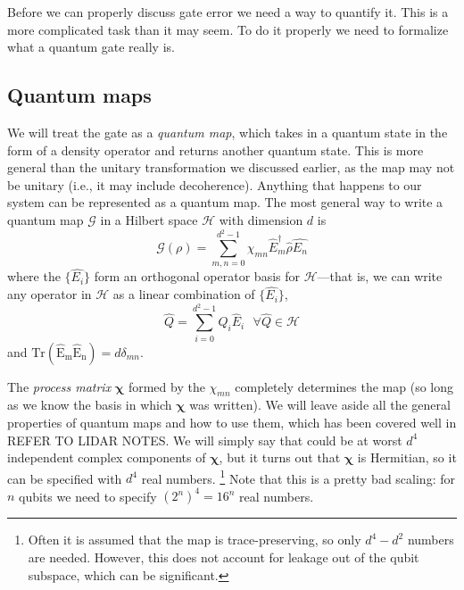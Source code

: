Before we can properly discuss gate error we need a way to quantify it. This is a more complicated task than it may seem. To do it properly we need to formalize what a quantum gate really is.

\subsection{Quantum maps}
We will treat the gate as a \textit{quantum map}, which takes in a quantum state in the form of a density operator and returns another quantum state. This is more general than the unitary transformation we discussed earlier, as the map may not be unitary (i.e., it may include decoherence). Anything that happens to our system can be represented as a quantum map. The most general way to write a quantum map $\mathcal{G}$ in a Hilbert space $\bm{\mathcal{H}}$ with dimension $d$ is
\begin{equation}
    \mathcal{G}(\rho) = \sum_{m,n=0}^{d^2-1}\chi_{mn}\hat{E}_m^\dag \hat{\rho} \hat{E_n}
\end{equation}
where the $\{\hat{E_i}\}$ form an orthogonal operator basis for $\bm{\mathcal{H}}$---that is, we can write any operator in $\bm{\mathcal{H}}$ as a linear combination of $\{\hat{E_i}\}$,
\begin{equation}
    \hat{Q} = \sum_{i=0}^{d^2-1}Q_i \hat{E}_i \ \ \  \forall \hat{Q} \in\bm{\mathcal{H}}
\end{equation}
and $\mathrm{Tr(\hat{E}_m\hat{E}_n)} = d\delta_{mn}$. 

The \textit{process matrix} $\bm{\chi}$ formed by the $\chi_{mn}$ completely determines the map (so long as we know the basis in which $\bm{\chi}$ was written). We will leave aside all the general properties of quantum maps and how to use them, which has been covered well in REFER TO LIDAR NOTES. We will simply say that could be at worst $d^4$ independent complex components of $\bm{\chi}$, but it turns out that $\bm{\chi}$ is Hermitian, so it can be specified with $d^4$ real numbers. \footnote{Often it is assumed that the map is trace-preserving, so only $d^4-d^2$ numbers are needed. However, this does not account for leakage out of the qubit subspace, which can be significant.} Note that this is a pretty bad scaling: for $n$ qubits we need to specify $(2^n)^4 = 16^n$ real numbers.

